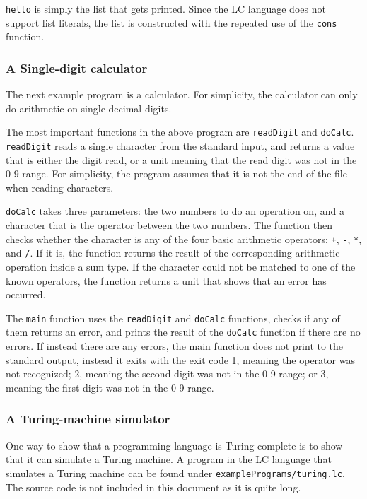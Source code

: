 \documentclass[12pt]{article}
\begin{document}
\verb$hello$ is simply the list that gets printed. Since the LC language does
not support list literals, the list is constructed with the repeated use of the
\verb$cons$ function.

\subsubsection{A Single-digit calculator}

The next example program is a calculator. For simplicity, the calculator can
only do arithmetic on single decimal digits.



The most important functions in the above program are \verb$readDigit$ and
\verb$doCalc$. \verb$readDigit$ reads a single character from the standard
input, and returns a value that is either the digit read, or a unit meaning that
the read digit was not in the 0-9 range. For simplicity, the program assumes
that it is not the end of the file when reading characters.

\verb$doCalc$ takes three parameters: the two numbers to do an operation on, and
a character that is the operator between the two numbers. The function then
checks whether the character is any of the four basic arithmetic operators:
\verb$+$, \verb$-$, \verb$*$, and \verb$/$. If it is, the function returns the
result of the corresponding arithmetic operation inside a sum type. If the
character could not be matched to one of the known operators, the function
returns a unit that shows that an error has occurred.

The \verb$main$ function uses the \verb$readDigit$ and \verb$doCalc$ functions,
checks if any of them returns an error, and prints the result of the
\verb$doCalc$ function if there are no errors. If instead there are any errors,
the main function does not print to the standard output, instead it exits with
the exit code 1, meaning the operator was not recognized; 2, meaning the second
digit was not in the 0-9 range; or 3, meaning the first digit was not in the 0-9
range.

\subsubsection{A Turing-machine simulator}

One way to show that a programming language is Turing-complete is to show that
it can simulate a Turing machine. A program in the LC language that simulates a
Turing machine can be found under \verb$examplePrograms/turing.lc$. The source
code is not included in this document as it is quite long.
\end{document}
